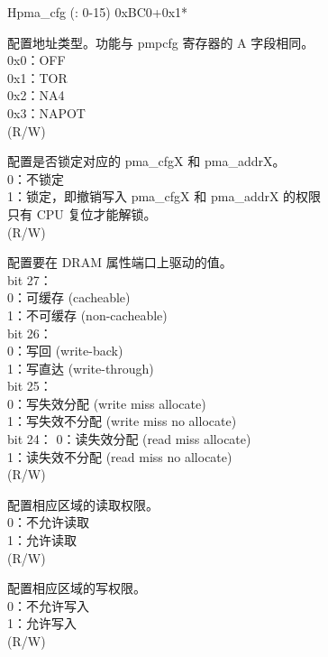 \begin{register}{H}{pma\_cfg (: 0-15)} {0xBC0+0x1*}
\label{regdesc:pma_cfgX}
%
%
%
%
%
%
%
%
%
%
\regnewline%
\begin{regdesc}
\begin{reglist}
\label{fielddesc:A}\item [A] 配置地址类型。功能与 pmpcfg 寄存器的 A 字段相同。\\
0x0：OFF\\
0x1：TOR\\
0x2：NA4\\
0x3：NAPOT\\
(R/W)
\label{fielddesc:LOCK}\item [LOCK] 配置是否锁定对应的 pma\_cfgX 和 pma\_addrX。\\
0：不锁定\\
1：锁定，即撤销写入 pma\_cfgX 和 pma\_addrX 的权限\\
只有 CPU 复位才能解锁。\\
(R/W)
\label{fielddesc:ATTRIBUTE}\item [ATTRIBUTE] 配置要在 DRAM 属性端口上驱动的值。\\
bit 27： \\
0：可缓存 (cacheable)\\
1：不可缓存 (non-cacheable)\\
bit 26：\\
0：写回 (write-back)\\
1：写直达 (write-through)\\
bit 25：\\
0：写失效分配 (write miss allocate)\\
1：写失效不分配 (write miss no allocate)\\
bit 24：
0：读失效分配 (read miss allocate) \\
1：读失效不分配 (read miss no allocate)\\
(R/W)
\label{fielddesc:READ}\item [READ] 配置相应区域的读取权限。\\
0：不允许读取\\
1：允许读取\\
(R/W)
\label{fielddesc:WRITE}\item [WRITE] 配置相应区域的写权限。\\
0：不允许写入\\
1：允许写入\\
(R/W)
\item [见下页……]
\end{reglist}\end{regdesc}
\end{register}
